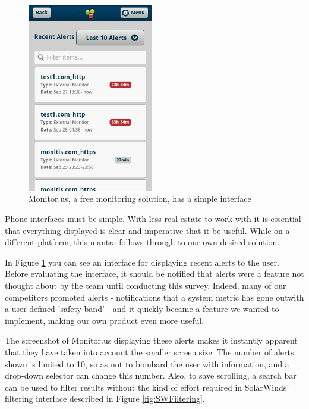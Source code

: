 \documentclass{l3proj}
\begin{document}
\begin{figure}[H]
\centering
\includegraphics[width=55mm]
{Competitors/MonitorUS_iPhoneAlerts.png}
\caption{Monitor.us, a free monitoring solution, has a simple interface}
\label{fig:MUSiPhone1}
\end{figure}

Phone interfaces must be simple. With less real estate to work with it is essential that everything displayed is clear and imperative that it be useful. While on a different platform, this mantra follows through to our own desired solution.

In Figure \ref{fig:MUSiPhone1} you can see an interface for displaying recent alerts to the user. Before evaluating the interface, it should be notified that alerts were a feature not thought about by the team until conducting this survey. Indeed, many of our competitors promoted alerts - notifications that a system metric has gone outwith a user defined 'safety band' - and it quickly became a feature we wanted to implement, making our own product even more useful.

The screenshot of Monitor.us displaying these alerts makes it instantly apparent that they have taken into account the smaller screen size. The number of alerts shown is limited to 10, so as not to bombard the user with information, and a drop-down selector can change this number. Also, to save scrolling, a search bar can be used to filter results without the kind of effort required in SolarWinds' filtering interface described in Figure \ref{fig:SWFiltering}.
\end{document}

